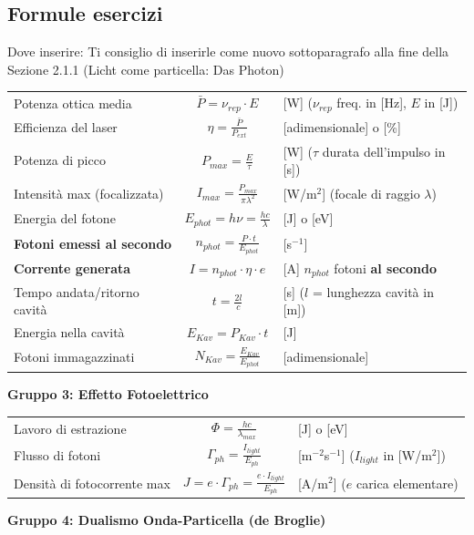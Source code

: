 \subsection{Formule esercizi}
Dove inserire: Ti consiglio di inserirle come nuovo sottoparagrafo alla fine della Sezione 2.1.1 (Licht come particella: Das Photon)

\renewcommand{\arraystretch}{1.9}
\begin{tabular}{lcl}
    Potenza ottica media & $\bar{P} = \nu_{rep} \cdot E$ & [W] ($\nu_{rep}$ freq. in [Hz], $E$ in [J]) \\ 
    Efficienza del laser & $\eta = \frac{\bar{P}}{P_{ext}}$ & [adimensionale] o [\%] \\ 
    Potenza di picco & $P_{max} = \frac{E}{\tau}$ & [W] ($\tau$ durata dell'impulso in [s]) \\ 
    Intensità max (focalizzata) & $I_{max} = \frac{P_{max}}{\pi \lambda^2}$ & [W/m$^2$] (focale di raggio $\lambda$) \\ 
    Energia del fotone & $E_{phot} = h\nu = \frac{hc}{\lambda}$ & [J] o [eV] \\ 
    \textbf{Fotoni emessi al secondo} & $n_{phot} = \frac{P\cdot t}{E_{phot}}$ & [s$^{-1}$] \\ 
    \textbf{Corrente generata} & $I = n_{phot} \cdot \eta \cdot e $ & [A] $n_{phot}$ fotoni \textbf{al secondo} \\
    Tempo andata/ritorno cavità & $t = \frac{2l}{c}$ & [s] ($l$ = lunghezza cavità in [m]) \\ 
    Energia nella cavità & $E_{Kav} = P_{Kav} \cdot t$ & [J] \\ 
    Fotoni immagazzinati & $N_{Kav} = \frac{E_{Kav}}{E_{phot}}$ & [adimensionale] \\ 
\end{tabular}

\textbf{Gruppo 3: Effetto Fotoelettrico}

\begin{tabular}{lcl}
    Lavoro di estrazione & $\Phi = \frac{hc}{\lambda_{max}}$ & [J] o [eV] \\ 
    Flusso di fotoni & $\Gamma_{ph} = \frac{I_{light}}{E_{ph}}$ & [m$^{-2}$s$^{-1}$] ($I_{light}$ in [W/m$^2$]) \\ 
    Densità di fotocorrente max & $J = e \cdot \Gamma_{ph} = \frac{e \cdot I_{light}}{E_{ph}}$ & [A/m$^2$] ($e$ carica elementare) \\ 
\end{tabular}

\textbf{Gruppo 4: Dualismo Onda-Particella (de Broglie)}

